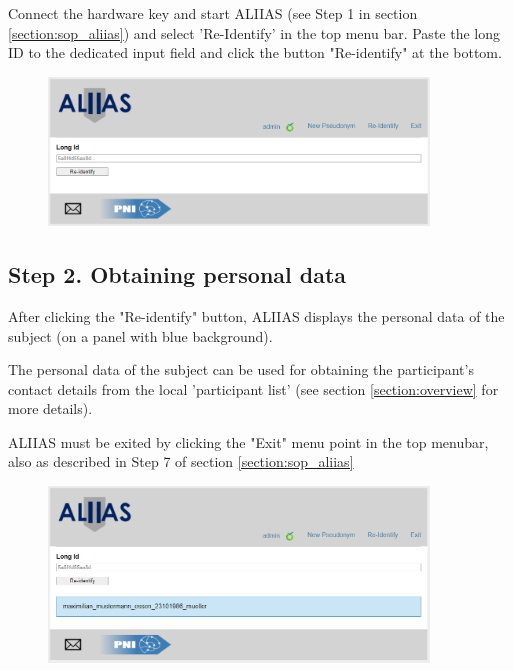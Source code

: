 Connect the hardware key and start ALIIAS (see Step 1 in section \ref{section:sop_aliias}) and select 'Re-Identify' in the top menu bar. 
Paste the long ID to the dedicated input field and click the button "Re-identify" at the bottom.

\vspace{1mm}

\small\setlength\fboxsep{5pt}\setlength\fboxrule{1pt}

\vspace{1mm}

\small\setlength\fboxsep{5pt}\setlength\fboxrule{1pt}
\large

\begin{figure}[H]
\includegraphics[width=0.9\textwidth]{docs/fig/06_reidentify.PNG}
\end{figure}

\subsection*{Step 2. Obtaining personal data}

After clicking the "Re-identify" button, ALIIAS displays the personal data of the subject (on a panel with blue background).

The personal data of the subject can be used for obtaining the participant's contact details from the local 'participant list' (see section \ref{section:overview} for more details).

ALIIAS must be exited by clicking the "Exit" menu point in the top menubar, also as described in Step 7 of section \ref{section:sop_aliias}

\begin{figure}[H]
\includegraphics[width=0.9\textwidth]{docs/fig/07_reidentify_result.PNG}
\end{figure}
